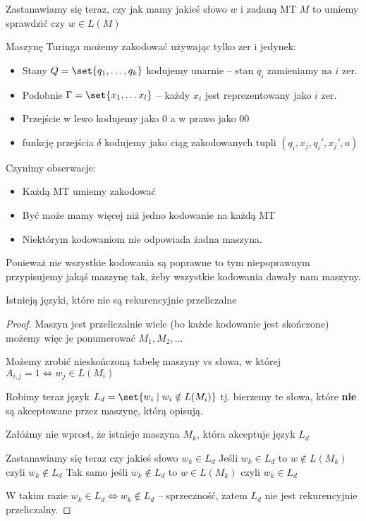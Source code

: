 Zastanawiamy się teraz, czy jak mamy jakieś słowo \( w \) i zadaną MT \( M \) to umiemy sprawdzić czy \( w \in L(M) \)

Maszynę Turinga możemy zakodować używając tylko zer i jedynek:
\begin{itemize}
    \item Stany \( Q = \set{q_1, \dots, q_k} \) kodujemy unarnie -- stan \( q_i \) zamieniamy na \( i \) zer.
    
    \item Podobnie \( \Gamma = \set{x_1, \dots x_l} \) -- każdy \( x_i \) jest reprezentowany jako \( i \) zer.
    
    \item Przejście w lewo kodujemy jako \(0\) a w prawo jako \(00\)
    
    \item funkcję przejścia \( \delta \) kodujemy jako ciąg zakodowanych tupli \( (q_i, x_j, q_i', x_j', a) \)
\end{itemize}

Czynimy obserwacje:
\begin{itemize}
    \item Każdą MT umiemy zakodować
    \item Być może mamy więcej niż jedno kodowanie na każdą MT
    \item Niektórym kodowaniom nie odpowiada żadna maszyna.
\end{itemize}

Ponieważ nie wszystkie kodowania są poprawne to tym niepoprawnym przypisujemy jakąś maszynę tak, żeby wszystkie kodowania dawały nam maszyny.

\begin{lemma}
    Istnieją języki, które nie są rekurencyjnie przeliczalne
\end{lemma}

\begin{proof}
Maszyn jest przeliczalnie wiele (bo każde kodowanie jest skończone) możemy więc je ponumerować \( M_1, M_2, \dots \)

Możemy zrobić nieskończoną tabelę maszyny vs słowa, w której \( A_{i, j} = 1 \iff w_j \in L(M_i) \) 

Robimy teraz język \( L_d = \set{w_i \mid w_i \notin L(M_i)} \) tj. bierzemy te słowa, które \textbf{nie} są akceptowane przez maszynę, którą opisują.

Załóżmy nie wprost, że istnieje maszyna \( M_k \), która akceptuje język \( L_d \)

Zastanawiamy się teraz czy jakieś słowo \( w_k \in L_d \)
Jeśli \( w_k \in L_d \) to \( w \notin L(M_k) \) czyli \( w_k \notin L_d \)
Tak samo jeśli \( w_k \notin L_d \) to \( w \in L(M_k) \) czyli \( w_k \in L_d \)

W takim razie \( w_k \in L_d \iff w_k \notin L_d \) -- sprzeczność, zatem \( L_d \) nie jest rekurencyjnie przeliczalny.
\end{proof}



